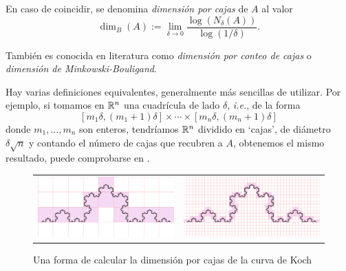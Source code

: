 En caso de coincidir, se denomina \textit{dimensión por cajas} de $A$ al valor 
\begin{equation}
  \label{eq:dim-cajas}
  \dim_{B}(A) := \lim_{\delta\rightarrow 0}\frac{\log(N_\delta(A))}{\log(1/\delta)}.
\end{equation}

También es conocida en literatura como \textit{dimensión por conteo de cajas} o \textit{dimensión de Minkowski-Bouligand}.

Hay varias definiciones equivalentes, generalmente más sencillas de utilizar. Por ejemplo, si tomamos en $\mathbb{R}^n$ una cuadrícula de lado $\delta$, \textit{i.e.}, de la forma
$$
[m_1 \delta, (m_1+1)\delta]\times\cdots\times[m_n \delta, (m_n+1)\delta]
$$
donde $m_1,\dots,m_n$ son enteros, tendríamos $\mathbb{R}^n$ dividido en `cajas', de diámetro $\delta\sqrt{n}$ y contando el número de cajas que recubren a $A$, obtenemos el mismo resultado, puede comprobarse en \cite[sección 3.1]{alma991007022459704990}.

\begin{figure}[ht]
\begin{tabular}{cc}
\includegraphics[scale=0.17]{./img/cajas-grandes.png} &   \includegraphics[scale=0.17]{./img/cajas-peques.png} \\
\end{tabular}
\caption{Una forma de calcular la dimensión por cajas de la curva de Koch}
\label{fig:dim-cajas}
\end{figure}

